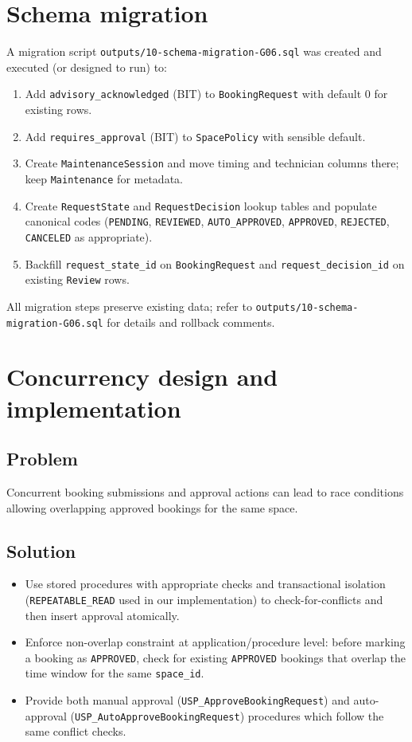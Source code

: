 \documentclass[12pt,a4paper]{article}
\begin{document}
\section{Schema migration}
A migration script \texttt{outputs/10-schema-migration-G06.sql} was created and executed (or designed to run) to:
\begin{enumerate}[nosep]
  \item Add \texttt{advisory\_acknowledged} (BIT) to \texttt{BookingRequest} with default 0 for existing rows.
  \item Add \texttt{requires\_approval} (BIT) to \texttt{SpacePolicy} with sensible default.
  \item Create \texttt{MaintenanceSession} and move timing and technician columns there; keep \texttt{Maintenance} for metadata.
  \item Create \texttt{RequestState} and \texttt{RequestDecision} lookup tables and populate canonical codes (\texttt{PENDING}, \texttt{REVIEWED}, \texttt{AUTO\_APPROVED}, \texttt{APPROVED}, \texttt{REJECTED}, \texttt{CANCELED} as appropriate).
  \item Backfill \texttt{request\_state\_id} on \texttt{BookingRequest} and \texttt{request\_decision\_id} on existing \texttt{Review} rows.
\end{enumerate}

All migration steps preserve existing data; refer to \texttt{outputs/10-schema-migration-G06.sql} for details and rollback comments.

\section{Concurrency design and implementation}
\subsection{Problem}
Concurrent booking submissions and approval actions can lead to race conditions allowing overlapping approved bookings for the same space.

\subsection{Solution}
\begin{itemize}[nosep]
  \item Use stored procedures with appropriate checks and transactional isolation (\texttt{REPEATABLE\_READ} used in our implementation) to check-for-conflicts and then insert approval atomically.
  \item Enforce non-overlap constraint at application/procedure level: before marking a booking as \texttt{APPROVED}, check for existing \texttt{APPROVED} bookings that overlap the time window for the same \texttt{space\_id}.
  \item Provide both manual approval (\texttt{USP\_ApproveBookingRequest}) and auto-approval (\texttt{USP\_AutoApproveBookingRequest}) procedures which follow the same conflict checks.
\end{itemize}
\end{document}
